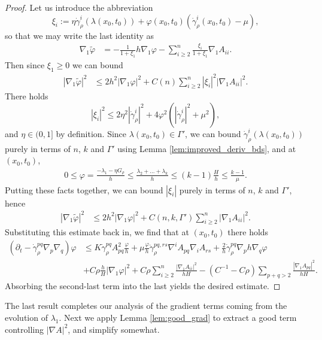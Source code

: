 \documentclass[12pt]{amsart}
\begin{document}
\begin{proof}
Let us introduce the abbreviation 
\[\xi_i := \eta\dot \gamma_\rho^i(\lambda(x_0,t_0)) + \varphi(x_0,t_0)(\dot \gamma_\rho^i(x_0,t_0) - \mu),\]
so that we may write the last identity as
\begin{align*}
\nabla_1 \tilde \varphi &= -\frac{1}{1+\xi_1} h \nabla_1 \varphi - \sum_{i \geq 2}^n \frac{\xi_i}{1+\xi_1}\nabla_1 A_{ii}.
\end{align*}
Then since $\xi_1 \geq 0$ we can bound 
\begin{align*}
|\nabla_1 \tilde \varphi|^2 &\leq 2 h^2 |\nabla_1 \varphi|^2 + C(n) \sum_{i \geq 2}^n |\xi_i|^2|\nabla_1 A_{ii}|^2.
\end{align*}
There holds
\[|\xi_i|^2 \leq 2  \eta^2 |\dot \gamma_\rho^i|^2 + 4 \varphi^2(|\dot \gamma_\rho^i|^2 + \mu^2),\]
and $\eta \in (0,1]$ by definition. Since $\lambda(x_0,t_0) \in \Gamma'$, we can bound $\dot \gamma_\rho^{i}(\lambda(x_0,t_0))$ purely in terms of $n$, $k$ and $\Gamma'$ using Lemma \ref{lem:improved_deriv_bds}, and at $(x_0,t_0)$, 
\begin{align*}
0 \leq  \varphi = \frac{-\lambda_1 - \eta G_\rho}{h} \leq \frac{ \lambda_2 +\dots+ \lambda_k}{h} \leq (k-1) \frac{ H}{h} \leq \frac{k-1}{\mu}.
\end{align*}
Putting these facts together, we can bound $|\xi_i|$ purely in terms of $n$, $k$ and $\Gamma'$, hence
\begin{align*}
|\nabla_1 \tilde \varphi|^2 &\leq 2 h^2 |\nabla_1 \varphi|^2 + C(n,k,\Gamma') \sum_{i \geq 2}^n |\nabla_1 A_{ii}|^2.
\end{align*}
Substituting this estimate back in, we find that at $(x_0,t_0)$ there holds 
\begin{align*}
(\partial_t - \dot \gamma_{\rho}^{pq} \nabla_p \nabla_q)\varphi &\leq  K\dot \gamma_\rho^{pq} A^2_{pq}\frac{\varphi}{h}  + \mu\frac{\varphi}{h} \ddot \gamma_\rho^{pq,rs}  \nabla^i A_{pq} \nabla_i A_{rs} + \frac{2}{h} \dot \gamma^{pq}_\rho \nabla_p h  \nabla_q \varphi\\
&+C\rho\frac{h}{H}|\nabla_1 \varphi|^2 +  C \rho \sum_{i \geq 2}^n \frac{|\nabla_1 A_{ii}|^2}{hH}  - (C^{-1} - C \rho ) \sum_{p+q> 2} \frac{|\nabla_1 A_{pq}|^2}{hH} .
\end{align*}
Absorbing the second-last term into the last yields the desired estimate. 
\end{proof}

The last result completes our analysis of the gradient terms coming from the evolution of $\lambda_1$. Next we apply Lemma \ref{lem:good_grad} to extract a good term controlling $|\nabla A|^2$, and simplify somewhat.
\end{document}
